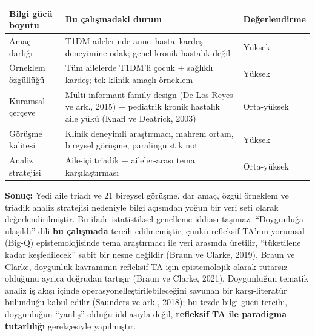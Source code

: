 \documentclass[
  turkish,
  a4paper,
  DIV=11,
  numbers=noendperiod]{scrreprt}
\newcounter{none} %
\begin{document}
{\def\LTcaptype{none} %
\begin{longtable}[]{@{}
  >{\raggedright\arraybackslash}p{}
  >{\raggedright\arraybackslash}p{}
  >{\raggedright\arraybackslash}p{}@{}}
\toprule\noalign{}
\begin{minipage}[b]{\linewidth}\raggedright
Bilgi gücü boyutu
\end{minipage} & \begin{minipage}[b]{\linewidth}\raggedright
Bu çalışmadaki durum
\end{minipage} & \begin{minipage}[b]{\linewidth}\raggedright
Değerlendirme
\end{minipage} \\
\midrule\noalign{}
\endhead
\bottomrule\noalign{}
\endlastfoot
Amaç darlığı & T1DM ailelerinde anne--hasta--kardeş deneyimine odak;
genel kronik hastalık değil & Yüksek \\
Örneklem özgüllüğü & Tüm ailelerde T1DM'li çocuk + sağlıklı kardeş; tek
klinik amaçlı örneklem & Yüksek \\
Kuramsal çerçeve & Multi-informant family design (De Los Reyes ve ark.,
2015) + pediatrik kronik hastalık aile yükü (Knafl ve Deatrick, 2003) &
Orta-yüksek \\
Görüşme kalitesi & Klinik deneyimli araştırmacı, mahrem ortam, bireysel
görüşme, paralinguistik not & Yüksek \\
Analiz stratejisi & Aile-içi triadik + aileler-arası tema
karşılaştırması & Orta-yüksek \\
\end{longtable}
}

\textbf{Sonuç:} Yedi aile triadı ve 21 bireysel görüşme, dar amaç, özgül
örneklem ve triadik analiz stratejisi nedeniyle bilgi açısından yoğun
bir veri seti olarak değerlendirilmiştir. Bu ifade istatistiksel
genelleme iddiası taşımaz. ``Doygunluğa ulaşıldı'' dili \textbf{bu
çalışmada} tercih edilmemiştir; çünkü refleksif TA'nın yorumsal (Big-Q)
epistemolojisinde tema araştırmacı ile veri arasında üretilir,
``tüketilene kadar keşfedilecek'' sabit bir nesne değildir (Braun ve
Clarke, 2019). Braun ve Clarke, doygunluk kavramının refleksif TA için
epistemolojik olarak tutarsız olduğunu ayrıca doğrudan tartışır (Braun
ve Clarke, 2021). Doygunluğun tematik analiz iş akışı içinde
operasyonelleştirilebileceğini savunan bir karşı-literatür bulunduğu
kabul edilir (Saunders ve ark., 2018); bu tezde bilgi gücü tercihi,
doygunluğun ``yanlış'' olduğu iddiasıyla değil, \textbf{refleksif TA ile
paradigma tutarlılığı} gerekçesiyle yapılmıştır.
\end{document}
